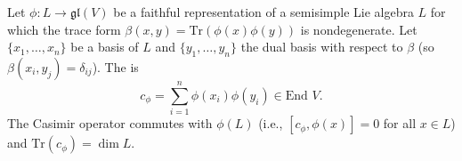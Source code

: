 Let $\phi: L \rightarrow \mathfrak{gl}(V)$ be a faithful representation of a semisimple Lie algebra $L$ for which the trace form $\beta(x,y) = \text{Tr}(\phi(x)\phi(y))$ is nondegenerate. Let $\{x_1, \ldots, x_n\}$ be a basis of $L$ and $\{y_1, \ldots, y_n\}$ the dual basis with respect to $\beta$ (so $\beta(x_i, y_j) = \delta_{ij}$). The  is
$$c_\phi = \sum_{i=1}^n \phi(x_i)\phi(y_i) \in \text{End } V.$$
The Casimir operator commutes with $\phi(L)$ (i.e., $[c_\phi, \phi(x)] = 0$ for all $x \in L$) and $\text{Tr}(c_\phi) = \dim L$.
